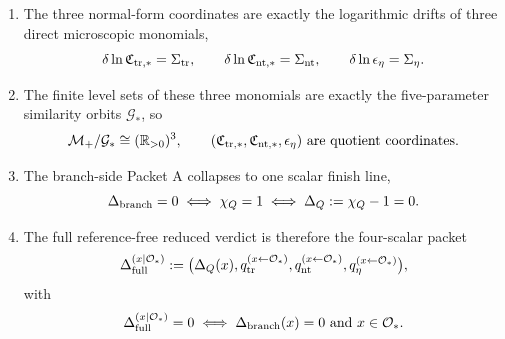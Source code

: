 \begin{theorem}
\begin{enumerate}[leftmargin=2.2em]
  \begin{equation}
  \label{eq:part05-theorem-triangular}
  \Theta_1=-C_{\rm tr}\Sigma_{\rm tr},
  \qquad
  \Xi_1=A_{\rm tr}\Sigma_{\rm tr}+\Sigma_{\rm nt},
  \qquad
  \mathcal R_1+\Xi_1=-\frac{\epsilon_\eta}{1-\epsilon_\eta}\Sigma_\eta.
  \end{equation}
  \item The three normal-form coordinates are exactly the logarithmic drifts of three direct microscopic monomials,
  \begin{equation}
  \label{eq:part05-theorem-monomials}
  \delta\ln\mathfrak C_{{\rm tr},*}=\Sigma_{\rm tr},
  \qquad
  \delta\ln\mathfrak C_{{\rm nt},*}=\Sigma_{\rm nt},
  \qquad
  \delta\ln\epsilon_\eta=\Sigma_\eta.
  \end{equation}
  \item The finite level sets of these three monomials are exactly the five-parameter similarity orbits \(\mathcal G_*\), so
  \begin{equation}
  \label{eq:part05-theorem-quotient}
  \mathcal M_+/\mathcal G_*
  \cong
  (\mathbb R_{>0})^3,
  \qquad
  (\mathfrak C_{{\rm tr},*},\mathfrak C_{{\rm nt},*},\epsilon_\eta)
  \text{ are quotient coordinates.}
  \end{equation}
  \item The branch-side Packet A collapses to one scalar finish line,
  \begin{equation}
  \label{eq:part05-theorem-packetA}
  \Delta_{\rm branch}=0
  \iff
  \chi_Q=1
  \iff
  \Delta_Q:=\chi_Q-1=0.
  \end{equation}
  \item The full reference-free reduced verdict is therefore the four-scalar packet
  \begin{equation}
  \label{eq:part05-theorem-finalpacket}
  \Delta_{\rm full}^{(x\mid\mathcal O_*)}
  :=
  \bigl(
  \Delta_Q(x),
  q_{\rm tr}^{(x\leftarrow\mathcal O_*)},
  q_{\rm nt}^{(x\leftarrow\mathcal O_*)},
  q_\eta^{(x\leftarrow\mathcal O_*)}
  \bigr),
  \end{equation}
  with
  \begin{equation}
  \label{eq:part05-theorem-finalzero}
  \Delta_{\rm full}^{(x\mid\mathcal O_*)}=0
  \iff
  \Delta_{\rm branch}(x)=0
  \text{ and }
  x\in\mathcal O_*.
  \end{equation}
\end{enumerate}
\end{theorem}

